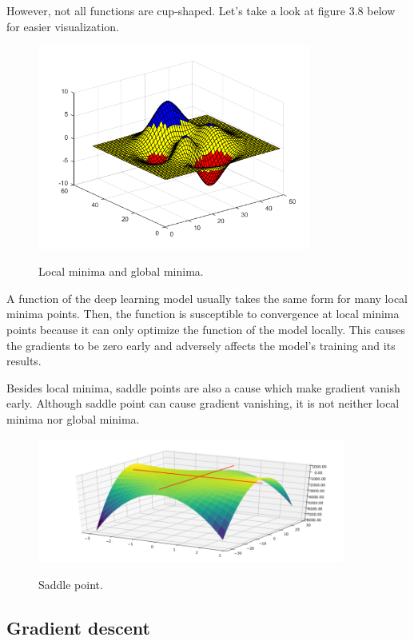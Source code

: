 	However, not all functions are cup-shaped. Let's take a look at figure 3.8 below for easier visualization.
	
	\begin{figure}[H]
		\centering
		{\includegraphics[width=0.8\textwidth]{./hinhanh/chap3/global.png}}
		\caption{Local minima and global minima.}
	\end{figure}
	
	A function of the deep learning model usually takes the same form for many local minima points. Then, the function is susceptible to convergence at local minima points because it can only optimize the function of the model locally. This causes the gradients to be zero early and adversely affects the model's training and its results.
	
	Besides local minima, saddle points are also a cause which make gradient vanish early. Although saddle point can cause gradient vanishing, it is not neither local minima nor global minima. 
	
	\begin{figure}[H]
		\centering
		{\includegraphics[width=0.9\textwidth]{./hinhanh/chap3/saddle.png}}
		\caption{Saddle point.}
	\end{figure}
	
	
\subsection{Gradient descent}
	\noindent
	
